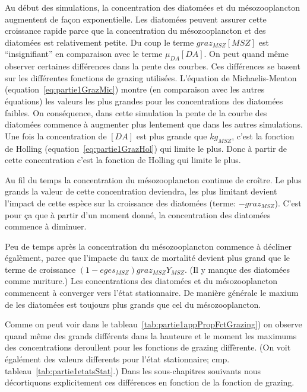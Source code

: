 {\par{
Au début des simulations, la concentration des diatomées et du mésozooplancton augmentent de
façon exponentielle. Les diatomées peuvent assurer cette croissance rapide parce que la concentration du
mésozooplancton et des diatomées est relativement petite. Du coup le terme $graz_{MSZ} [MSZ]$ est
``insignifiant'' en comparaison avec le terme $\mu_{DA}[DA]$. On peut quand même observer certaines
différences dans la pente des courbes. Ces différences se basent sur les différentes fonctions de grazing
utilisées. L'équation de Michaelis-Menton (equation~\ref{eq:partie1GrazMic}) montre (en comparaison avec
les autres équations) les valeurs les plus grandes pour les concentrations des diatomées faibles.
On conséquence, dans cette simulation la pente de la courbe des diatomées commence à augmenter plus lentement
que dans les autres simulations. Une fois la concentration de $[DA]$ est plus grande que $kg_{MSZ}$,
c'est la fonction de Holling (equation~\ref{eq:partie1GrazHol}) qui limite le plus. Donc à partir de
cette concentration c'est la fonction de Holling qui limite le plus.
}
\par{
Au fil du temps la concentration du mésozooplancton continue de croître. Le plus grands la valeur 
de cette concentration deviendra, les plus limitant devient l'impact de cette espèce sur la croissance
des diatomées (terme: $-graz_{MSZ}$). C'est pour ça que à partir d'un moment donné, la concentration
des diatomées commence à diminuer.
}
\par{
Peu de temps après la concentration du mésozooplancton commence à décliner égalèment, parce que
l'impacte du taux de mortalité devient plus grand que le terme de croissance $(1-eges_{MSZ})graz_{MSZ}Y_{MSZ}$.
(Il y manque des diatomées comme nuriture.) Les concentrations des diatomées et du mésozooplancton
commencent à converger vers l'état stationnaire. De manière générale le maxium de les diatomées est
toujours plus grands que cel du mésozooplancton.
}
\par{
Comme on peut voir dans le tableau~\ref{tab:partie1appPropFctGrazing}) on observe quand même des
grands différents dans la hauteure et le moment les maximums des concentrations deroullent
pour les fonctions de grazing diffèrente. (On voit égalément des valeurs differents pour l'état
stationnaire; cmp. tableau~\ref{tab:partie1etatsStat}.)
Dans les sous-chapitres souivants nous décortiquons explicitement ces différences en fonction de la
fonction de grazing.
}

}
